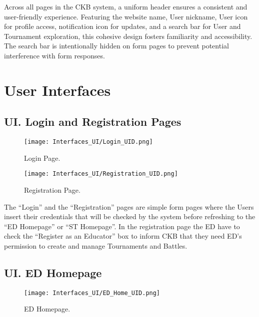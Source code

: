 Across all pages in the CKB system, a uniform header ensures a consistent and user-friendly experience. Featuring the website name, User nickname, User icon for profile access, notification icon for updates, and a search bar for User and Tournament exploration, this cohesive design fosters familiarity and accessibility. The search bar is intentionally hidden on form pages to prevent potential interference with form responses. 

\newpage

\section{User Interfaces}
\setcounter{ui}{1}
\newcommand{\cui}{\theui{}}

\subsection*{UI\cui . Login and Registration Pages}

\begin{figure}[H]
    \begin{center}
        \texttt{[image: Interfaces\_UI/Login\_UID.png]}
        \caption{Login Page.}
        \label{fig:login_page}%
    \end{center}

    \begin{center}
        \texttt{[image: Interfaces\_UI/Registration\_UID.png]}
        \caption{Registration Page.}
        \label{fig:registration_page}%
    \end{center}
\end{figure}

The “Login” and the “Registration” pages are simple form pages where the Users insert their credentials that will be checked by the system before refreshing to the “ED Homepage” or “ST Homepage”. In the registration page the ED have to check the “Register as an Educator” box to inform CKB that they need ED’s permission to create and manage Tournaments and Battles. 

\subsection*{UI\cui . ED Homepage}

\begin{figure}[H]
    \begin{center}
        \texttt{[image: Interfaces\_UI/ED\_Home\_UID.png]}
        \caption{ED Homepage.}
        \label{fig:ed_homepage}%
    \end{center}
\end{figure}

